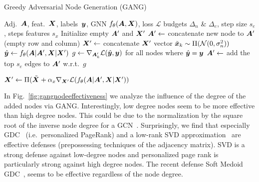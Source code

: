 \documentclass[sigconf,authordraft]{acmart}
\newcommand{\adj}{\mA}
\newcommand{\features}{\mX}
\begin{document}
\begin{algorithm}[t]
  \small
  \caption{Greedy Adversarial Node Generation (GANG)}
  \label{algo:gang}
  \begin{algorithmic}[1]
     Adj.\ \(\adj\), feat.\ \(\features\), labels\ \({\bm{y}}\), GNN \(f_{\theta}(\adj, \features)\), loss \(\mathcal{L}\)
     budgets \(\Delta_n\) \& \(\Delta_e\), step size \(s_e\), steps features \(s_x\)
    \STATE Initialize empty \(\adj^\prime\) and \(\features^\prime\)
    \STATE \(\adj^\prime \leftarrow\) concatenate new node to \(\adj^\prime\) (empty row and column)
    \STATE \(\features^\prime \leftarrow\) concatenate \(\features^\prime\) vector \(\tilde{{\bm{x}}}_k \sim \Pi(\mathcal{N}(0, \sigma_n^2))\)
    \STATE \(\hat{\vy} \leftarrow f_{\theta}(\adj | \adj^\prime, \features | \features^\prime)\)
    \STATE \(g \leftarrow \nabla_{\adj^\prime_k} \mathcal{L}(\hat{\vy}, \vy)\) for all nodes where \(\hat{{\bm{y}}} = {\bm{y}}\)
    \STATE \(\adj^\prime \leftarrow\) add the top \(s_e\) edges to \(\adj^\prime\) w.r.t.~\(g\)
    \ENDFOR


    \STATE \(\features^\prime \leftarrow \Pi(\tilde{\features} + \alpha_x \nabla_{\features^\prime} \mathcal{L}(f_{\theta}(\adj | \adj^\prime, \features | \features^\prime))\)
    \ENDFOR
    \ENDFOR
  \end{algorithmic}
\end{algorithm}

In Fig.~\ref{fig:gangnodeeffectiveness} we analyze the influence of the degree of the added nodes via GANG. Interestingly, low degree nodes seem to be more effective than high degree nodes. This could be due to the normalization by the square root of the inverse node degree for a GCN~\cite{Kipf2017}. Surprisingly, we find that especially GDC~\cite{Klicpera2019a} (i.e.~personalized PageRank) and a low-rank SVD approximation~\cite{Entezari2020} are effective defenses (prepossessing techniques of the adjacency matrix). SVD is a strong defense against low-degree nodes and personalized page rank is particularly strong against high degree nodes. The recent defense Soft Medoid GDC~\citep{Geisler2020}, seems to be effective regardless of the node degree.
\end{document}

